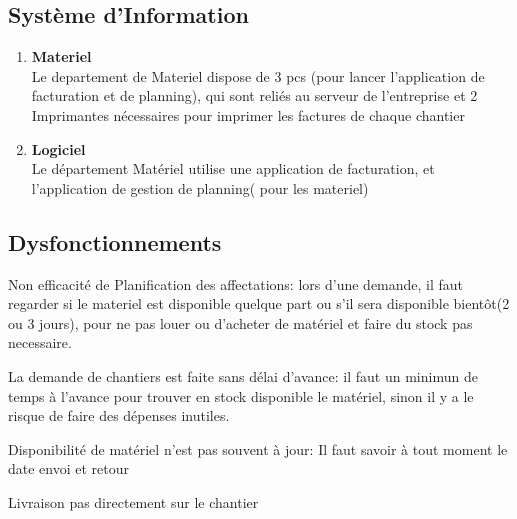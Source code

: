 \subsection{Système d'Information}
\begin{enumerate}

\item  \textbf{Materiel}\\

Le departement de Materiel dispose de 3 pcs (pour lancer l'application de facturation et de planning), qui sont reliés au serveur de l'entreprise et 2 Imprimantes nécessaires pour imprimer les factures de chaque chantier\\

\item  \textbf{Logiciel}\\

Le département Matériel utilise une application de facturation, et l'application de gestion de planning( pour les materiel)\\
\end{enumerate}

\subsection{Dysfonctionnements}


Non efficacité de Planification des affectations: lors d'une demande, il faut regarder si le materiel est disponible quelque part ou s'il sera disponible bientôt(2 ou 3 jours), pour ne pas louer ou d'acheter de matériel et faire du stock pas necessaire.

La demande de chantiers est faite sans délai d'avance: il faut un minimun de temps à l'avance pour trouver en stock disponible le matériel, sinon il y a le risque de faire des dépenses inutiles.

Disponibilité de matériel n'est pas souvent à jour: Il faut savoir à tout moment le date envoi et retour

Livraison pas directement sur le chantier
